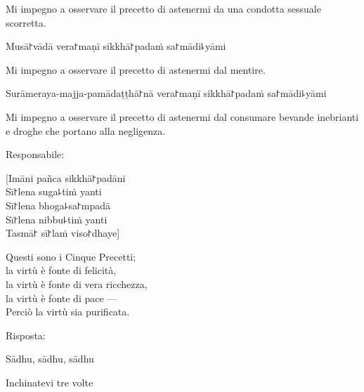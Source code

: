 \begin{english}
  Mi impegno a osservare il precetto di astenermi da una condotta sessuale scorretta.
\end{english}

\clearpage

\begin{precept}
  \setcounter{enumi}{3}
  \item Musā꜓vādā vera꜓maṇī sikkhā꜓padaṁ sa꜓mādi꜕yāmi
\end{precept}

\begin{english}
  Mi impegno a osservare il precetto di astenermi dal mentire.
\end{english}

\begin{precept}
  \setcounter{enumi}{4}
  \item Surāmeraya-majja-pamādaṭṭhā꜓nā vera꜓maṇī sikkhā꜓padaṁ sa꜓mādi꜕yāmi
\end{precept}

\begin{english}
  Mi impegno a osservare il precetto di astenermi dal consumare bevande inebrianti e droghe che portano alla negligenza.
\end{english}

\begin{instruction}
  Responsabile:
\end{instruction}

[Imāni pañca sikkhā꜓padāni\\
Sī꜓lena suga꜕tiṁ yanti\\
Sī꜓lena bhoga꜕sa꜓mpadā\\
Sī꜓lena nibbu꜕tiṁ yanti\\
Tasmā꜓ sī꜓laṁ viso꜓dhaye]

\begin{english}
  Questi sono i Cinque Precetti;\\
  la virtù è fonte di felicità,\\
  la virtù è fonte di vera ricchezza,\\
  la virtù è fonte di pace ---\\
  Perciò la virtù sia purificata.
\end{english}

\begin{instruction}
  Risposta:
\end{instruction}

Sādhu, sādhu, sādhu

\begin{instruction}
  Inchinatevi tre volte
\end{instruction}
